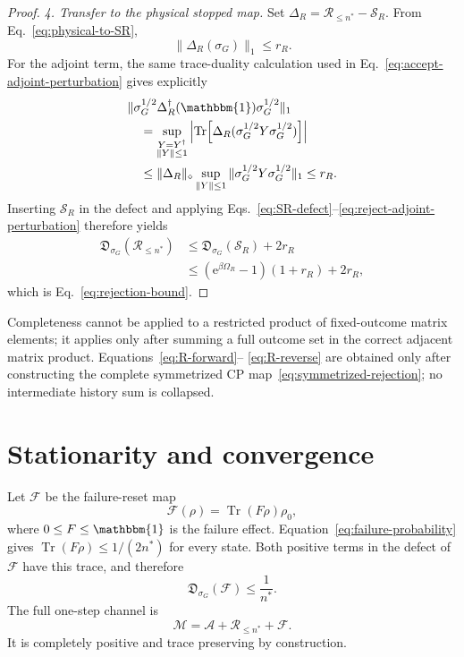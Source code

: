 \documentclass[aps,floatfix,10pt,amssymb,amsmath,superscriptaddress,nofootinbib,longbibliography,nobalancelastpage,twocolumn]{revtex4-2}
\newcommand{\id}{\mathbbm{1}}
\newcommand{\cA}{\mathcal{A}}
\newcommand{\cF}{\mathcal{F}}
\newcommand{\cM}{\mathcal{M}}
\newcommand{\cR}{\mathcal{R}}
\newcommand{\Tr}{\operatorname{Tr}}
\newcommand{\e}{\mathrm{e}}
\begin{document}
\begin{proof}
\emph{4. Transfer to the physical stopped map.}
Set $\Delta_R=\cR_{\leq n^*}-\mathcal S_R$.  From
Eq.~\eqref{eq:physical-to-SR},
\begin{equation}
 \|\Delta_R(\sigma_G)\|_1\leq r_R.
 \label{eq:reject-output-perturbation}
\end{equation}
For the adjoint term, the same trace-duality calculation used in
Eq.~\eqref{eq:accept-adjoint-perturbation} gives explicitly
\begin{align}
 &\|\sigma_G^{1/2}\Delta_R^\dagger(\id)
 \sigma_G^{1/2}\|_1\nonumber\\
 &\quad=\sup_{\substack{Y=Y^\dagger\\\|Y\|\leq1}}
 \left|\Tr\!\left[
 \Delta_R(\sigma_G^{1/2}Y\sigma_G^{1/2})\right]\right|
 \nonumber\\
 &\quad\leq\|\Delta_R\|_\diamond
 \sup_{\|Y\|\leq1}
 \|\sigma_G^{1/2}Y\sigma_G^{1/2}\|_1
 \leq r_R.
 \label{eq:reject-adjoint-perturbation}
\end{align}
Inserting $\mathcal S_R$ in the defect and applying
Eqs.~\eqref{eq:SR-defect}--\eqref{eq:reject-adjoint-perturbation}
therefore yields
\begin{align}
 \mathfrak D_{\sigma_G}(\cR_{\leq n^*})
 &\leq\mathfrak D_{\sigma_G}(\mathcal S_R)+2r_R\nonumber\\
 &\leq(\e^{\beta\Omega_R}-1)(1+r_R)+2r_R,
\end{align}
which is Eq.~\eqref{eq:rejection-bound}.
\end{proof}

Completeness cannot be applied to a restricted product of fixed-outcome
matrix elements; it applies only after summing a full outcome set in the
correct adjacent matrix product.  Equations~\eqref{eq:R-forward}--
\eqref{eq:R-reverse} are obtained only after constructing the complete
symmetrized CP map~\eqref{eq:symmetrized-rejection}; no intermediate
history sum is collapsed.

\section{Stationarity and convergence}
\label{sec:convergence}

Let $\cF$ be the failure-reset map
\begin{equation}
 \cF(\rho)=\Tr(F\rho)\rho_0,
 \label{eq:reset-map}
\end{equation}
where $0\leq F\leq\id$ is the failure effect.  Equation~\eqref{eq:failure-probability} gives $\Tr(F\rho)\leq1/(2n^*)$ for every state.  Both positive terms in the defect of $\cF$ have this trace, and therefore
\begin{equation}
 \mathfrak D_{\sigma_G}(\cF)\leq\frac{1}{n^*}.
 \label{eq:failure-defect}
\end{equation}
The full one-step channel is
\begin{equation}
 \cM=\cA+\cR_{\leq n^*}+\cF.
 \label{eq:full-channel}
\end{equation}
It is completely positive and trace preserving by construction.
\end{document}
